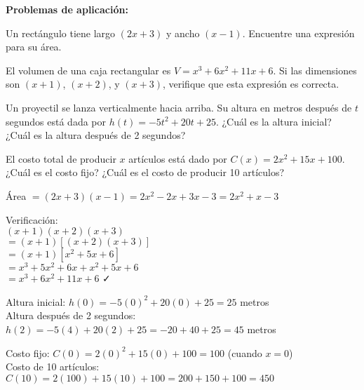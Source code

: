 \begin{exercise}
\problem \textbf{Problemas de aplicación:}

\begin{exerciselist}
    \item Un rectángulo tiene largo $(2x + 3)$ y ancho $(x - 1)$. Encuentre una expresión para su área.
    
    \item El volumen de una caja rectangular es $V = x^3 + 6x^2 + 11x + 6$. Si las dimensiones son $(x + 1)$, $(x + 2)$, y $(x + 3)$, verifique que esta expresión es correcta.
    
    \item Un proyectil se lanza verticalmente hacia arriba. Su altura en metros después de $t$ segundos está dada por $h(t) = -5t^2 + 20t + 25$. ¿Cuál es la altura inicial? ¿Cuál es la altura después de 2 segundos?
    
    \item El costo total de producir $x$ artículos está dado por $C(x) = 2x^2 + 15x + 100$. ¿Cuál es el costo fijo? ¿Cuál es el costo de producir 10 artículos?
\end{exerciselist}

\begin{solucion}
\begin{exerciselist}
    \item Área $= (2x + 3)(x - 1) = 2x^2 - 2x + 3x - 3 = 2x^2 + x - 3$
    
    \item Verificación:\\
    $(x + 1)(x + 2)(x + 3)$\\
    $= (x + 1)[(x + 2)(x + 3)]$\\
    $= (x + 1)[x^2 + 5x + 6]$\\
    $= x^3 + 5x^2 + 6x + x^2 + 5x + 6$\\
    $= x^3 + 6x^2 + 11x + 6$ ✓
    
    \item Altura inicial: $h(0) = -5(0)^2 + 20(0) + 25 = 25$ metros\\
    Altura después de 2 segundos: $h(2) = -5(4) + 20(2) + 25 = -20 + 40 + 25 = 45$ metros
    
    \item Costo fijo: $C(0) = 2(0)^2 + 15(0) + 100 = 100$ (cuando $x = 0$)\\
    Costo de 10 artículos: $C(10) = 2(100) + 15(10) + 100 = 200 + 150 + 100 = 450$
\end{exerciselist}
\end{solucion}
\end{exercise}
